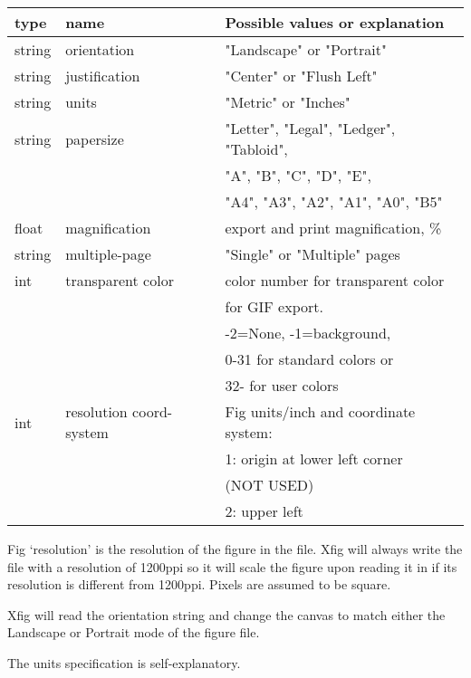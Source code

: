 \documentclass[10pt, a4paper]{article}
\begin{document}
\begin{tabular}{|lll|}
\hline
type & name & Possible values or explanation \\
\hline
\hline
string & orientation             & "Landscape" or "Portrait" \\
string & justification           & "Center" or "Flush Left" \\
string & units                   & "Metric" or "Inches" \\
string & papersize               & "Letter", "Legal", "Ledger", "Tabloid",\\
&&                                  "A", "B", "C", "D", "E",\\
&&                                  "A4", "A3", "A2", "A1", "A0", "B5" \\
float  & magnification           & export and print magnification, \% \\
string & multiple-page           & "Single" or "Multiple" pages \\
int    & transparent color       & color number for transparent color \\
&&                                 for GIF export. \\
&&                                -2=None, -1=background, \\
&&                                0-31 for standard colors or \\
&&                                32- for user colors \\
int    & resolution coord-system & Fig units/inch and coordinate system:\\
&&                                 1: origin at lower left corner \\
&&                                    (NOT USED)\\
&&                                 2: upper left \\
\hline
\end{tabular}



 Fig `resolution' is the resolution of the figure in the file.
    Xfig will always write the file with a resolution of 1200ppi so it
    will scale the figure upon reading it in if its resolution is different
    from 1200ppi.  Pixels are assumed to be square.

    Xfig will read the orientation string and change the canvas to match
    either the Landscape or Portrait mode of the figure file.

    The units specification is self-explanatory.
\end{document}
